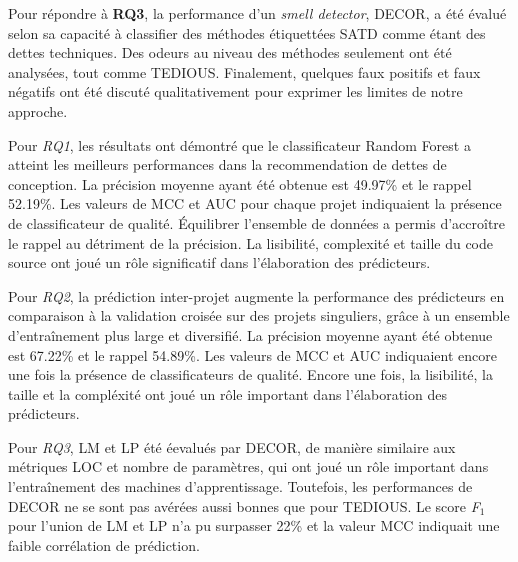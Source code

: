 Pour r\'{e}pondre \`{a} \textbf{RQ3}, la performance d'un \emph{smell detector}, \ac{DECOR}, a \'{e}t\'{e} \'{e}valu\'{e} selon sa capacit\'{e} \`{a} classifier des m\'{e}thodes \'{e}tiquett\'{e}es \ac{SATD} comme \'{e}tant des dettes techniques. Des odeurs au niveau des m\'{e}thodes seulement ont \'{e}t\'{e} analys\'{e}es, tout comme \ac{TEDIOUS}. Finalement, quelques faux positifs et faux n\'{e}gatifs ont \'{e}t\'{e} discut\'{e} qualitativement pour exprimer les limites de notre approche. \par

Pour \emph{RQ1}, les r\'{e}sultats ont d\'{e}montr\'{e} que le classificateur Random Forest a atteint les meilleurs performances dans la recommendation de dettes de conception. La pr\'{e}cision moyenne ayant \'{e}t\'{e} obtenue est 49.97\% et le rappel 52.19\%. Les valeurs de \ac{MCC} et \ac{AUC} pour chaque projet indiquaient la pr\'{e}sence de classificateur de qualit\'{e}. \'{E}quilibrer l'ensemble de donn\'{e}es a permis d'accro\^{i}tre le rappel au d\'{e}triment de la pr\'{e}cision. La lisibilit\'{e}, complexit\'{e} et taille du code source ont jou\'{e} un r\^{o}le significatif dans l'\'{e}laboration des pr\'{e}dicteurs. \par

Pour \emph{RQ2}, la pr\'{e}diction inter-projet augmente la performance des pr\'{e}dicteurs en comparaison \`{a} la validation crois\'{e}e sur des projets singuliers, gr\^{a}ce \`{a} un ensemble d'entra\^{i}nement plus large et diversifi\'{e}. La pr\'{e}cision moyenne ayant \'{e}t\'{e} obtenue est 67.22\% et le rappel 54.89\%. Les valeurs de \ac{MCC} et \ac{AUC} indiquaient encore une fois la pr\'{e}sence de classificateurs de qualit\'{e}. Encore une fois, la lisibilit\'{e}, la taille et la compl\'{e}xit\'{e} ont jou\'{e} un r\^{o}le important dans l'\'{e}laboration des pr\'{e}dicteurs. \par

Pour \emph{RQ3}, \ac{LM} et \ac{LP} \'{e}t\'{e} \'{e}evalu\'{e}s par \ac{DECOR}, de mani\`{e}re similaire aux m\'{e}triques \ac{LOC} et nombre de param\`{e}tres, qui ont jou\'{e} un r\^{o}le important dans l'entra\^{i}nement des machines d'apprentissage. Toutefois, les performances de \ac{DECOR} ne se sont pas av\'{e}r\'{e}es aussi bonnes que pour \ac{TEDIOUS}. Le score \emph{F$_{1}$} pour l'union de \ac{LM} et \ac{LP} n'a pu surpasser 22\% et la valeur \ac{MCC} indiquait une faible corr\'{e}lation de pr\'{e}diction. \par

